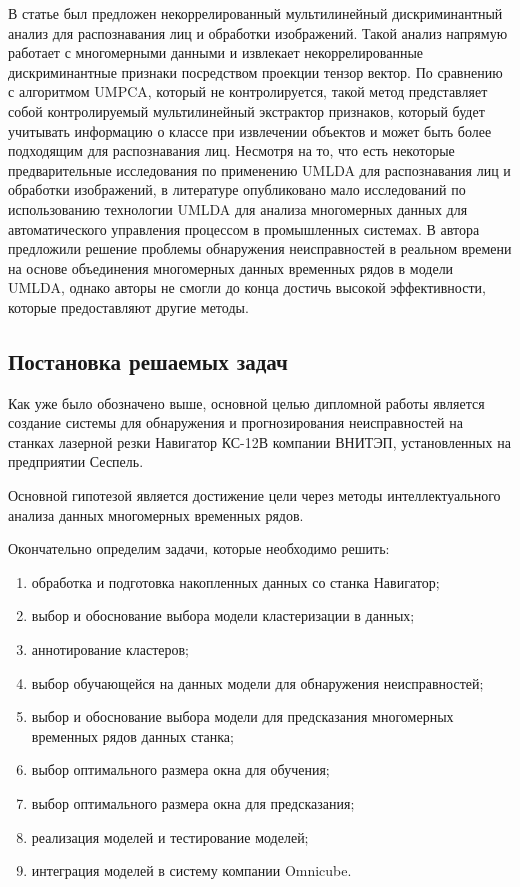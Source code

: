 В статье \cite{4-17} был предложен некоррелированный мультилинейный дискриминантный анализ 
для распознавания лиц и обработки изображений. 
Такой анализ напрямую работает с многомерными данными и извлекает некоррелированные 
дискриминантные признаки посредством проекции тензор вектор. 
По сравнению с алгоритмом UMPCA, который не контролируется, такой метод представляет собой контролируемый 
мультилинейный экстрактор признаков, который будет учитывать информацию о классе при извлечении объектов 
и может быть более подходящим для распознавания лиц. 
Несмотря на то, что есть некоторые предварительные исследования по применению UMLDA для распознавания лиц и обработки изображений, 
в литературе опубликовано мало исследований по использованию технологии 
UMLDA для анализа многомерных данных для автоматического управления процессом в промышленных системах.
В \cite{4} автора предложили решение проблемы обнаружения неисправностей в реальном времени
на основе объединения многомерных данных временных рядов в модели UMLDA,
однако авторы не смогли до конца достичь высокой эффективности,
которые предоставляют другие методы.

\subsection{Постановка решаемых задач}

Как уже было обозначено выше, основной целью дипломной работы является создание системы
для обнаружения и прогнозирования неисправностей на станках лазерной резки Навигатор КС-12В компании ВНИТЭП,
установленных на предприятии Сеспель.

Основной гипотезой является достижение цели через
методы интеллектуального анализа данных многомерных временных рядов.

Окончательно определим задачи, которые необходимо решить:

\begin{enumerate}
    \item обработка и подготовка накопленных данных со станка Навигатор;
    \item выбор и обоснование выбора модели кластеризации в данных;
    \item аннотирование кластеров;
    \item выбор обучающейся на данных модели для обнаружения неисправностей;
    \item выбор и обоснование выбора модели для предсказания многомерных временных рядов данных станка;
    \item выбор оптимального размера окна для обучения;
    \item выбор оптимального размера окна для предсказания;
    \item реализация моделей и тестирование моделей;
    \item интеграция моделей в систему компании Omnicube.
\end{enumerate}


